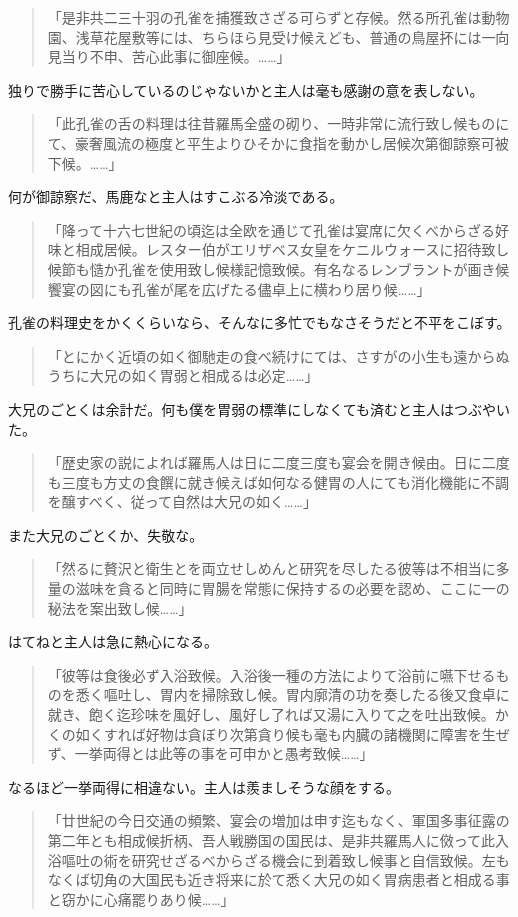 \documentclass[12pt, openright]{book}
\begin{document}
\blockquote{「是非共二三十羽の孔雀を捕獲致さざる可らずと存候。然る所孔雀は動物園、浅草花屋敷等には、ちらほら見受け候えども、普通の鳥屋抔には一向見当り不申、苦心此事に御座候。\ldots{}\ldots{}」}

独りで勝手に苦心しているのじゃないかと主人は毫も感謝の意を表しない。

\blockquote{「此孔雀の舌の料理は往昔羅馬全盛の砌り、一時非常に流行致し候ものにて、豪奢風流の極度と平生よりひそかに食指を動かし居候次第御諒察可被下候。\ldots{}\ldots{}」}

何が御諒察だ、馬鹿なと主人はすこぶる冷淡である。

\blockquote{「降って十六七世紀の頃迄は全欧を通じて孔雀は宴席に欠くべからざる好味と相成居候。レスター伯がエリザベス女皇をケニルウォースに招待致し候節も慥か孔雀を使用致し候様記憶致候。有名なるレンブラントが画き候饗宴の図にも孔雀が尾を広げたる儘卓上に横わり居り候\ldots{}\ldots{}」}

孔雀の料理史をかくくらいなら、そんなに多忙でもなさそうだと不平をこぼす。

\blockquote{「とにかく近頃の如く御馳走の食べ続けにては、さすがの小生も遠からぬうちに大兄の如く胃弱と相成るは必定\ldots{}\ldots{}」}

大兄のごとくは余計だ。何も僕を胃弱の標準にしなくても済むと主人はつぶやいた。

\blockquote{「歴史家の説によれば羅馬人は日に二度三度も宴会を開き候由。日に二度も三度も方丈の食饌に就き候えば如何なる健胃の人にても消化機能に不調を醸すべく、従って自然は大兄の如く\ldots{}\ldots{}」}

また大兄のごとくか、失敬な。

\blockquote{「然るに贅沢と衛生とを両立せしめんと研究を尽したる彼等は不相当に多量の滋味を貪ると同時に胃腸を常態に保持するの必要を認め、ここに一の秘法を案出致し候\ldots{}\ldots{}」}

はてねと主人は急に熱心になる。

\blockquote{「彼等は食後必ず入浴致候。入浴後一種の方法によりて浴前に嚥下せるものを悉く嘔吐し、胃内を掃除致し候。胃内廓清の功を奏したる後又食卓に就き、飽く迄珍味を風好し、風好し了れば又湯に入りて之を吐出致候。かくの如くすれば好物は貪ぼり次第貪り候も毫も内臓の諸機関に障害を生ぜず、一挙両得とは此等の事を可申かと愚考致候\ldots{}\ldots{}」}

なるほど一挙両得に相違ない。主人は羨ましそうな顔をする。

\blockquote{「廿世紀の今日交通の頻繁、宴会の増加は申す迄もなく、軍国多事征露の第二年とも相成候折柄、吾人戦勝国の国民は、是非共羅馬人に傚って此入浴嘔吐の術を研究せざるべからざる機会に到着致し候事と自信致候。左もなくば切角の大国民も近き将来に於て悉く大兄の如く胃病患者と相成る事と窃かに心痛罷りあり候\ldots{}\ldots{}」}
\end{document}
